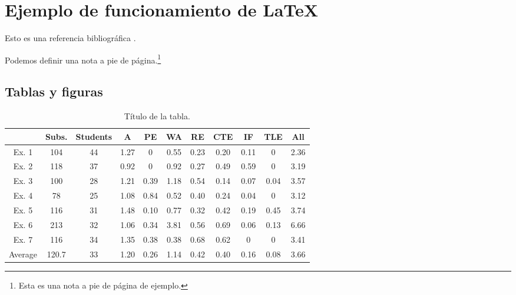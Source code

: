 \section{Ejemplo de funcionamiento de LaTeX}

Esto es una referencia bibliográfica \cite{bibex}.

Podemos definir una nota a pie de página.\footnote{Esta es una nota a pie de página de ejemplo.}

\subsection{Tablas y figuras}

\begin{table}
  \centering
  \caption{Título de la tabla.}
  \label{tab:una_tabla}

\begin{footnotesize}
\renewcommand{\arraystretch}{1.5} %
\begin{tabular}{ccccccccccc}
  \hline
   & Subs. & Students & A & PE & WA & RE & CTE & IF & TLE & All\\
  \hline
Ex. 1 & 104 & 44 & 1.27    &   0       &   0.55    &   0.23    &   0.20    &   0.11    &   0     & 2.36  \\
Ex. 2 & 118 & 37 & 0.92    &   0       &   0.92    &   0.27    &   0.49    &   0.59    &   0     & 3.19  \\
Ex. 3 & 100 & 28 & 1.21    &   0.39    &   1.18    &   0.54    &   0.14    &   0.07    &   0.04  & 3.57  \\
Ex. 4 & 78  & 25 & 1.08    &   0.84    &   0.52    &   0.40    &   0.24    &   0.04    &   0     & 3.12  \\
Ex. 5 & 116 & 31 & 1.48    &   0.10    &   0.77    &   0.32    &   0.42    &   0.19    &   0.45  & 3.74  \\
Ex. 6 & 213 & 32 & 1.06    &   0.34    &   3.81    &   0.56    &   0.69    &   0.06    &   0.13  & 6.66  \\
Ex. 7 & 116 & 34 & 1.35    &   0.38    &   0.38    &   0.68    &   0.62    &   0       &   0     & 3.41  \\
  \hline
Average & 120.7 & 33 & 1.20 &  0.26 &  1.14 &  0.42 &  0.40 &  0.16 &  0.08 & 3.66 \\
  \hline
 \end{tabular}
\end{footnotesize}

\end{table}









